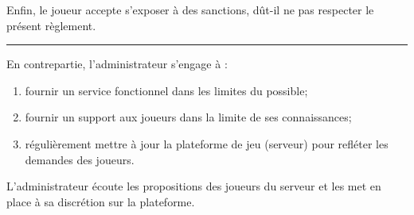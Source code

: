 \begin{flushleft}
\begin{enumerate}
	\end{enumerate}
	Enfin, le joueur accepte s'exposer \`a des sanctions, d\^ut-il ne pas respecter le pr\'esent r\`eglement.
	\noindent\rule{\textwidth}{1pt}
	En contrepartie, l'administrateur s'engage \`a :
	\begin{enumerate}
		\item fournir un service fonctionnel dans les limites du possible;
		\item fournir un support aux joueurs dans la limite de ses connaissances;
		\item r\'eguli\`erement mettre \`a jour la plateforme de jeu (serveur) pour refl\'eter les demandes des joueurs.
	\end{enumerate}
	L'administrateur \'ecoute les propositions des joueurs du serveur et les met en place \`a sa discr\'etion sur la plateforme.
\end{flushleft}
